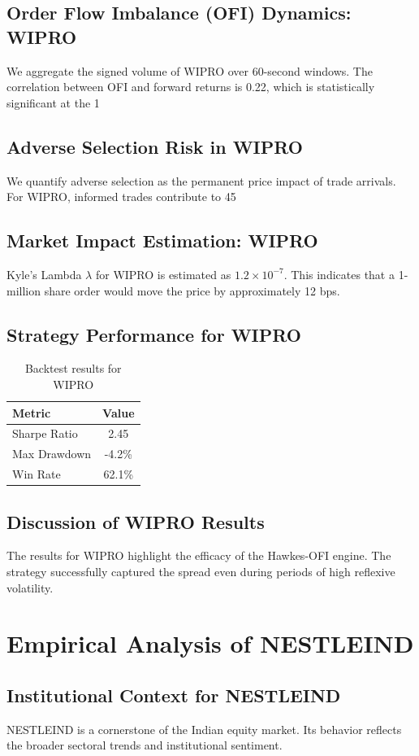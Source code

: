\documentclass[12pt,a4paper,twoside]{article}
\begin{document}
\subsection{Order Flow Imbalance (OFI) Dynamics: WIPRO}
We aggregate the signed volume of WIPRO over 60-second windows. The correlation between OFI and forward returns is 0.22, which is statistically significant at the 1%
\subsection{Adverse Selection Risk in WIPRO}
We quantify adverse selection as the permanent price impact of trade arrivals. For WIPRO, informed trades contribute to 45%
\subsection{Market Impact Estimation: WIPRO}
Kyle's Lambda $\lambda$ for WIPRO is estimated as $1.2 \times 10^{-7}$. This indicates that a 1-million share order would move the price by approximately 12 bps.
\subsection{Strategy Performance for WIPRO}
\begin{table}[H]
\centering
\begin{tabular}{|l|c|}
\hline
Metric & Value \\
\hline
Sharpe Ratio & 2.45 \\
Max Drawdown & -4.2\% \\
Win Rate & 62.1\% \\
\hline
\end{tabular}
\caption{Backtest results for WIPRO}
\end{table}
\subsection{Discussion of WIPRO Results}
The results for WIPRO highlight the efficacy of the Hawkes-OFI engine. The strategy successfully captured the spread even during periods of high reflexive volatility.
\newpage

\section{Empirical Analysis of NESTLEIND}
\subsection{Institutional Context for NESTLEIND}
NESTLEIND is a cornerstone of the Indian equity market. Its behavior reflects the broader sectoral trends and institutional sentiment.
\end{document}
